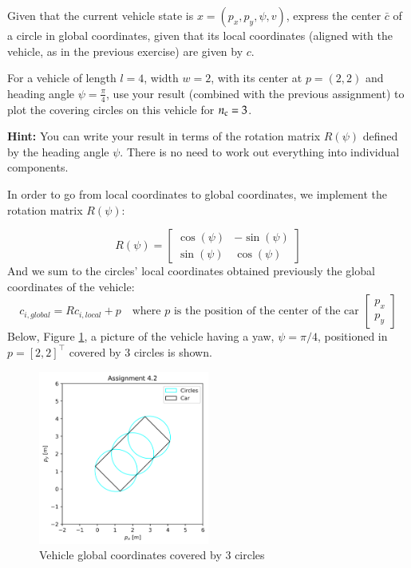 \documentclass[]{article}
\begin{document}
\begin{assignment}
	Given that the current vehicle state is $x = (p_x, p_y, \psi, v)$, 
	express the center $\bar{c}$ of a circle in global coordinates, given that its local coordinates 
	(aligned with the vehicle, as in the previous exercise) are given by $c$.

	For a vehicle of length $l = 4$, width $w = 2$, with its center at $p = (2,2)$
	and heading angle $\psi = \tfrac{\pi}{4}$, use your result (combined with the previous assignment) to plot the 
	covering circles on this vehicle for $n_{\mathrm{c}} = 3$.

	\textbf{Hint:} You can write your result in terms of the rotation matrix $R(\psi)$ defined by 
	the heading angle $\psi$. There is no need to work out everything into individual components.
\end{assignment}
\begin{flushleft}
	In order to go from local coordinates to global coordinates, we implement the rotation matrix $R(\psi)$:
\end{flushleft}
\[
	R(\psi) = \begin{bmatrix}
		\cos(\psi) & -\sin(\psi) \\
		\sin(\psi) & \cos(\psi)
	\end{bmatrix}
\]
And we sum to the circles' local coordinates obtained previously the global coordinates of the vehicle:
\[
	c_{i,global} = R c_{i,local} + p \quad \text{where } p \text{ is the position of the center of the car } 
	\begin{bmatrix}
		p_x \\ p_y
	\end{bmatrix}
\]
Below, Figure \ref{fig:assignment4_2}, a picture of the vehicle having a yaw, $ \psi = \pi/4 $, positioned in $	p = [2, 2]^\top $ covered by 3 circles is shown.
\begin{figure}[H]
    \centering
    \includegraphics[width=0.5\textwidth]{images/Assignment 4.2.png}
    \caption{Vehicle global coordinates covered by 3 circles}
    \label{fig:assignment4_2}
\end{figure}
\end{document}
